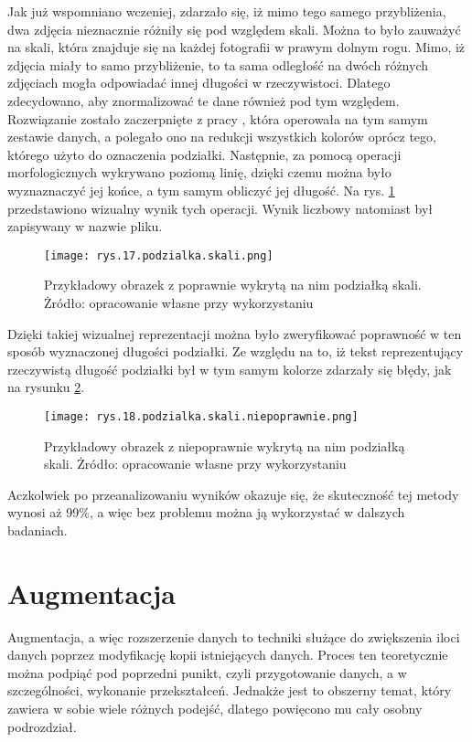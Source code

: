 Jak już wspomniano wczeniej, zdarzało się, iż mimo tego samego przybliżenia, dwa zdjęcia nieznacznie różniły się pod względem skali. Można to było zauważyć na skali, która znajduje się na każdej fotografii w prawym dolnym rogu. Mimo, iż zdjęcia miały to samo przybliżenie, to ta sama odległość na dwóch różnych zdjęciach mogła odpowiadać innej długości w rzeczywistoci. Dlatego zdecydowano, aby znormalizować te dane również pod tym względem. Rozwiązanie zostało zaczerpnięte z pracy \cite{Reczek21}, która operowała na tym samym zestawie danych, a polegało ono na redukcji wszystkich kolorów oprócz tego, którego użyto do oznaczenia podziałki. Następnie, za pomocą operacji morfologicznych wykrywano poziomą linię, dzięki czemu można było wyznaznaczyć jej końce, a tym samym obliczyć jej długość. Na rys. \ref{fig:mesh17} przedstawiono wizualny wynik tych operacji. Wynik liczbowy natomiast był zapisywany w nazwie pliku. 
\begin{figure}[h]
    \centering
    \texttt{[image: rys.17.podzialka.skali.png]}
    \caption{Przykładowy obrazek z poprawnie wykrytą na nim podziałką skali. Żródło: opracowanie własne przy wykorzystaniu \cite{Reczek21, Pirowski17}}
    \label{fig:mesh17}
\end{figure}
Dzięki takiej wizualnej reprezentacji można było zweryfikować poprawność w ten sposób wyznaczonej długości podziałki. Ze względu na to, iż tekst reprezentujący rzeczywistą długość podziałki był w tym samym kolorze zdarzały się błędy, jak na rysunku \ref{fig:mesh18}. 
\begin{figure}[h]
    \centering
    \texttt{[image: rys.18.podzialka.skali.niepoprawnie.png]}
    \caption{Przykładowy obrazek z niepoprawnie wykrytą na nim podziałką skali. Żródło: opracowanie własne przy wykorzystaniu \cite{Reczek21, Pirowski17}}
    \label{fig:mesh18}
\end{figure}
Aczkolwiek po przeanalizowaniu wyników okazuje się, że skuteczność tej metody wynosi aż 99\%, a więc bez problemu można ją wykorzystać w dalszych badaniach.

\section{Augmentacja}
\label{sec:augmentacja}

Augmentacja, a więc rozszerzenie danych to techniki służące do zwiększenia iloci danych poprzez modyfikację kopii istniejących danych. Proces ten teoretycznie można podpiąć pod poprzedni punikt, czyli przygotowanie danych, a w szczególności, wykonanie przekształceń. Jednakże jest to obszerny temat, który zawiera w sobie wiele różnych podejść, dlatego powięcono mu cały osobny podrozdział. 


